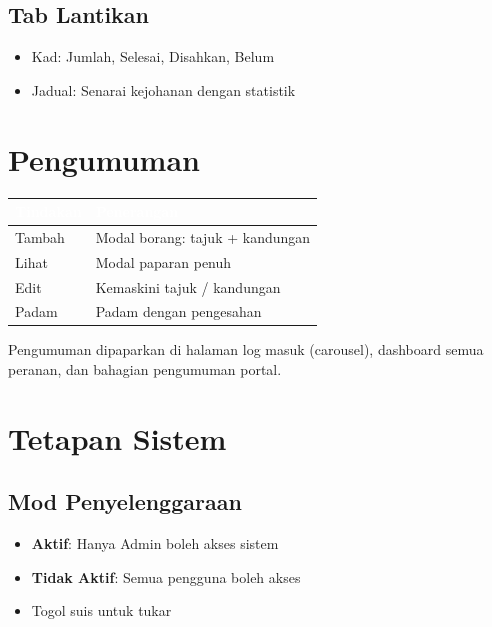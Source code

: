\documentclass[12pt,a4paper]{report}
\begin{document}
\subsection{Tab Lantikan}
\begin{itemize}[label=\textcolor{pbnpblue}{\faChevronRight}, nosep]
  \item Kad: Jumlah, Selesai, Disahkan, Belum
  \item Jadual: Senarai kejohanan dengan statistik
\end{itemize}

\section{Pengumuman}

\begin{table}[H]
\centering
{}
\begin{tabularx}{\textwidth}{l X}
\toprule
\rowcolor{tableheader}
\textcolor{white}{\textbf{Tindakan}} & \textcolor{white}{\textbf{Penerangan}} \\
\midrule
Tambah & Modal borang: tajuk + kandungan \\
Lihat & Modal paparan penuh \\
Edit & Kemaskini tajuk / kandungan \\
Padam & Padam dengan pengesahan \\
\bottomrule
\end{tabularx}
\end{table}

\begin{infobox}
Pengumuman dipaparkan di halaman log masuk (carousel), dashboard semua peranan, dan bahagian pengumuman portal.
\end{infobox}

\section{Tetapan Sistem}

\subsection{Mod Penyelenggaraan}
\begin{itemize}[label=\textcolor{pbnpblue}{\faChevronRight}]
  \item \textbf{Aktif}: Hanya Admin boleh akses sistem
  \item \textbf{Tidak Aktif}: Semua pengguna boleh akses
  \item Togol suis untuk tukar
\end{itemize}
\end{document}
